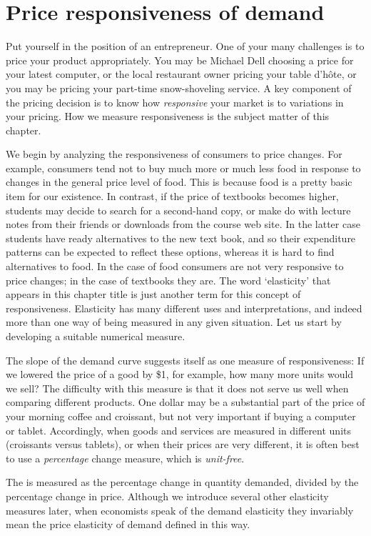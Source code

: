 \section{Price responsiveness of demand}\label{sec:ch4sec1}

Put yourself in the position of an entrepreneur. One of your many challenges is to price your product appropriately. You may be Michael Dell choosing a price for your latest computer, or the local restaurant owner pricing your table d'h\^{o}te, or you may be pricing your part-time snow-shoveling service. A key component of the pricing decision is to know how \textit{responsive} your market is to variations in your pricing. How we measure responsiveness is the subject matter of this chapter.

We begin by analyzing the responsiveness of consumers to price changes. For example, consumers tend not to buy much more or much less food in response to changes in the general price level of food. This is because food is a pretty basic item for our existence. In contrast, if the price of textbooks becomes higher, students may decide to search for a second-hand copy, or make do with lecture notes from their friends or downloads from the course web site. In the latter case students have ready alternatives to the new text book, and so their expenditure patterns can be expected to reflect these options, whereas it is hard to find alternatives to food. In the case of food consumers are not very responsive to price changes; in the case of textbooks they are. The word `elasticity' that appears in this chapter title is just another term for this concept of responsiveness. Elasticity has many different uses and interpretations, and indeed more than one way of being measured in any given situation. Let us start by developing a suitable numerical measure.

The slope of the demand curve suggests itself as one measure of responsiveness: If we lowered the price of a good by \$1, for example, how many more units would we sell? The difficulty with this measure is that it does not serve us well when comparing different products. One dollar may be a substantial part of the price of your morning coffee and croissant, but not very important if buying a computer or tablet. Accordingly, when goods and services are measured in different units (croissants versus tablets), or when their prices are very different, it is often best to use a \textit{percentage} change measure, which is \textit{unit-free}. 

The  is measured as the percentage change in quantity demanded, divided by the percentage change in price. Although we introduce several other elasticity measures later, when economists speak of the demand elasticity they invariably mean the price elasticity of demand defined in this way.

